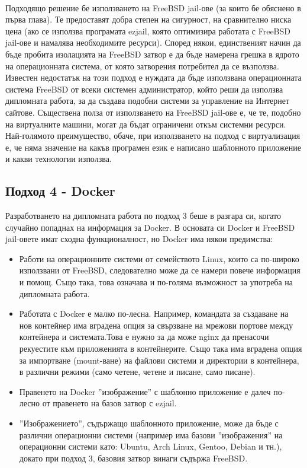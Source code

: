 \documentclass[pdftex,14pt,a4paper]{extreport}
\begin{document}
\paragraph {}

Подходящо решение бе използването на FreeBSD jail-ове (за които бе обяснено в първа глава). Те предоставят добра степен на сигурност, на сравнително ниска цена (ако се използва програмата ezjail, която оптимизира работата с FreeBSD jail-ове и намалява необходимите ресурси). Според някои, единственият начин да бъде пробита изолацията на FreeBSD затвор е да бъде намерена грешка в ядрото на операционната система, от която затворения потребител да се възползва. Известен недостатък на този подход е нуждата да бъде използвана операционната система FreeBSD от всеки системен администратор, който реши да използва дипломната работа, за да създава подобни системи за управление на Интернет сайтове. Съществена полза от използването на FreeBSD jail-ове е, че те, подобно на виртуалните машини, могат да бъдат ограничени откъм системни ресурси. Най-голямото преимущество, обаче, при използването на подход с виртуализация е, че няма значение на какъв програмен език е написано шаблонното приложение и какви технологии използва.
\subsection {Подход 4 - Docker}
Разработването на дипломната работа по подход 3 беше в разгара си, когато случайно попаднах на информация за Docker. В основата си Docker и FreeBSD jail-овете имат сходна функционалност, но Docker има някои предимства:
\begin{itemize}
  \item Работи на операционните системи от семейството Linux, които са по-широко използвани от FreeBSD, следователно може да се намери повече информация и помощ. Също така, това означава и по-голяма възможност за употреба на дипломната работа.
  \item Работата с Docker е малко по-лесна. Например, командата за създаване на нов контейнер има вградена опция за свързване на мрежови портове между контейнера и системата.Това е нужно за да може nginx да пренасочи рекуестите към приложенията в контейнерите. Също така има вградена опция за импортване (mount-ване) на файлови системи и директории в контейнера, в различни режими (само четене, четене и писане, само писане).
  \item Правенето на Docker ''изображение'' с шаблонно приложение е далеч по-лесно от правенето на базов затвор с ezjail.
  \item ''Изображението'', съдържащо шаблонното приложение, може да бъде с различни операционни системи (например има базови ''изображения'' на операционни системи като: Ubuntu, Arch Linux, Gentoo, Debian и тн.), докато при подход 3, базовия затвор винаги съдържа FreeBSD.
\end{itemize}
\end{document}
